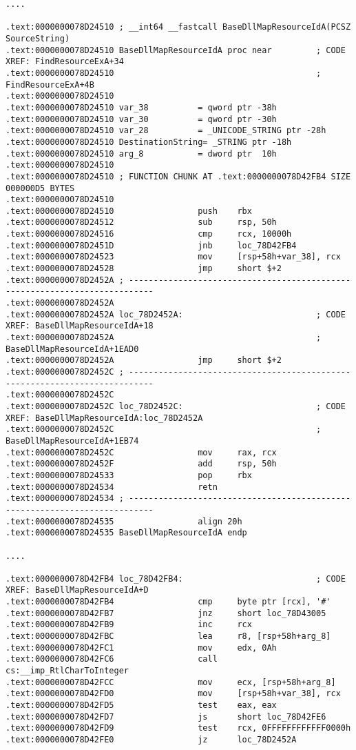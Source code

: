 \begin{lstlisting}[style=customasmx86]
....

.text:0000000078D24510 ; __int64 __fastcall BaseDllMapResourceIdA(PCSZ SourceString)
.text:0000000078D24510 BaseDllMapResourceIdA proc near         ; CODE XREF: FindResourceExA+34
.text:0000000078D24510                                         ; FindResourceExA+4B
.text:0000000078D24510
.text:0000000078D24510 var_38          = qword ptr -38h
.text:0000000078D24510 var_30          = qword ptr -30h
.text:0000000078D24510 var_28          = _UNICODE_STRING ptr -28h
.text:0000000078D24510 DestinationString= _STRING ptr -18h
.text:0000000078D24510 arg_8           = dword ptr  10h
.text:0000000078D24510
.text:0000000078D24510 ; FUNCTION CHUNK AT .text:0000000078D42FB4 SIZE 000000D5 BYTES
.text:0000000078D24510
.text:0000000078D24510                 push    rbx
.text:0000000078D24512                 sub     rsp, 50h
.text:0000000078D24516                 cmp     rcx, 10000h
.text:0000000078D2451D                 jnb     loc_78D42FB4
.text:0000000078D24523                 mov     [rsp+58h+var_38], rcx
.text:0000000078D24528                 jmp     short $+2
.text:0000000078D2452A ; ---------------------------------------------------------------------------
.text:0000000078D2452A
.text:0000000078D2452A loc_78D2452A:                           ; CODE XREF: BaseDllMapResourceIdA+18
.text:0000000078D2452A                                         ; BaseDllMapResourceIdA+1EAD0
.text:0000000078D2452A                 jmp     short $+2
.text:0000000078D2452C ; ---------------------------------------------------------------------------
.text:0000000078D2452C
.text:0000000078D2452C loc_78D2452C:                           ; CODE XREF: BaseDllMapResourceIdA:loc_78D2452A
.text:0000000078D2452C                                         ; BaseDllMapResourceIdA+1EB74
.text:0000000078D2452C                 mov     rax, rcx
.text:0000000078D2452F                 add     rsp, 50h
.text:0000000078D24533                 pop     rbx
.text:0000000078D24534                 retn
.text:0000000078D24534 ; ---------------------------------------------------------------------------
.text:0000000078D24535                 align 20h
.text:0000000078D24535 BaseDllMapResourceIdA endp

....

.text:0000000078D42FB4 loc_78D42FB4:                           ; CODE XREF: BaseDllMapResourceIdA+D
.text:0000000078D42FB4                 cmp     byte ptr [rcx], '#'
.text:0000000078D42FB7                 jnz     short loc_78D43005
.text:0000000078D42FB9                 inc     rcx
.text:0000000078D42FBC                 lea     r8, [rsp+58h+arg_8]
.text:0000000078D42FC1                 mov     edx, 0Ah
.text:0000000078D42FC6                 call    cs:__imp_RtlCharToInteger
.text:0000000078D42FCC                 mov     ecx, [rsp+58h+arg_8]
.text:0000000078D42FD0                 mov     [rsp+58h+var_38], rcx
.text:0000000078D42FD5                 test    eax, eax
.text:0000000078D42FD7                 js      short loc_78D42FE6
.text:0000000078D42FD9                 test    rcx, 0FFFFFFFFFFFF0000h
.text:0000000078D42FE0                 jz      loc_78D2452A


\end{lstlisting}
